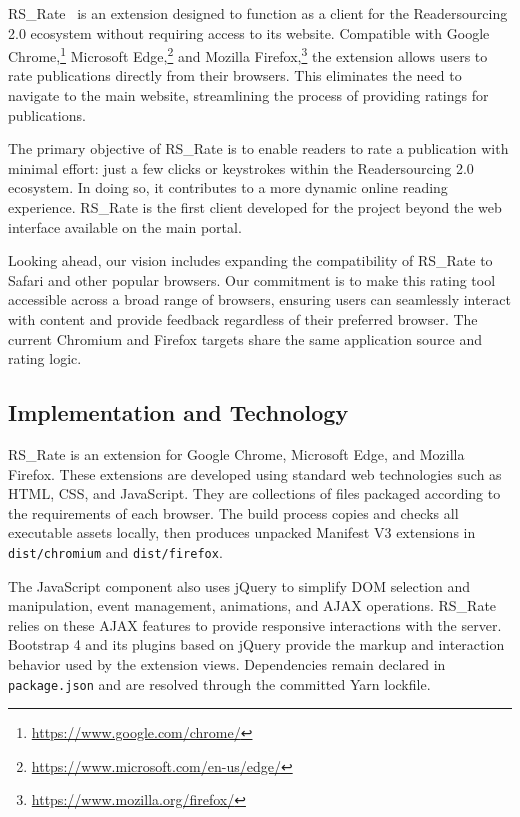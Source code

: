 \documentclass[a4paper, english]{article}
\newcommand{\rsrate}{RS\_Rate\xspace}
\begin{document}
\label{rs-rate}

\rsrate~\cite{RS-Rate} is an extension designed to function as a client for the Readersourcing 2.0 ecosystem without requiring access to its website. Compatible with Google Chrome,\footnote{\url{https://www.google.com/chrome/}} Microsoft Edge,\footnote{\url{https://www.microsoft.com/en-us/edge/}} and Mozilla Firefox,\footnote{\url{https://www.mozilla.org/firefox/}} the extension allows users to rate publications directly from their browsers. This eliminates the need to navigate to the main website, streamlining the process of providing ratings for publications.

The primary objective of \rsrate is to enable readers to rate a publication with minimal effort: just a few clicks or keystrokes within the Readersourcing 2.0 ecosystem. In doing so, it contributes to a more dynamic online reading experience. \rsrate is the first client developed for the project beyond the web interface available on the main portal.

Looking ahead, our vision includes expanding the compatibility of \rsrate to Safari and other popular browsers. Our commitment is to make this rating tool accessible across a broad range of browsers, ensuring users can seamlessly interact with content and provide feedback regardless of their preferred browser. The current Chromium and Firefox targets share the same application source and rating logic.

\subsection{Implementation and Technology}

\rsrate is an extension for Google Chrome, Microsoft Edge, and Mozilla Firefox. These extensions are developed using standard web technologies such as HTML, CSS, and JavaScript. They are collections of files packaged according to the requirements of each browser. The build process copies and checks all executable assets locally, then produces unpacked Manifest V3 extensions in \verb|dist/chromium| and \verb|dist/firefox|.

The JavaScript component also uses jQuery to simplify DOM selection and manipulation, event management, animations, and AJAX operations. \rsrate relies on these AJAX features to provide responsive interactions with the server. Bootstrap 4 and its plugins based on jQuery provide the markup and interaction behavior used by the extension views. Dependencies remain declared in \verb|package.json| and are resolved through the committed Yarn lockfile.
\end{document}
